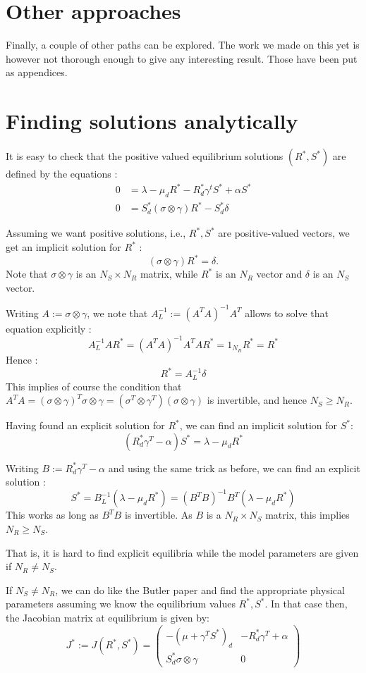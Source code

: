 \documentclass[12pt, titlepage]{report}
\begin{document}
	\section{Other approaches}
	Finally, a couple of other paths can be explored. The work we made on this yet is however not thorough enough to give any interesting result. Those have been put as appendices.
		\clearpage
		\section{Finding solutions analytically}
		It is easy to check that the positive valued equilibrium solutions $(R^*, S^*)$ are defined by the equations :
		\begin{align}
			0 &= \lambda - \mu_d R^* - R^*_d \gamma^t S^* + \alpha S^*  \label{eq : eq1}\\
			 0 &= S^*_d (\sigma \otimes \gamma) R^* - S^*_d \delta \label{eq : eq2}
		\end{align}

		Assuming we want positive solutions, i.e., $R^*, S^*$ are positive-valued vectors, we get an implicit solution for $R^*$ : $$ (\sigma \otimes \gamma) R^* = \delta. $$ Note that $\sigma \otimes \gamma$ is an $N_S \times N_R$ matrix, while $R^*$ is an $N_R$ vector and $\delta$ is an $N_S$ vector.

		Writing $A:= \sigma \otimes \gamma$, we note that $A_L^{-1} := (A^T A)^{-1} A^T$ allows to solve that equation explicitly : $$ A_L^{-1} A R^* = (A^T A)^{-1} A^T A R^* = 1_{N_R} R^* = R^*$$ Hence : $$ R^* = A_L^{-1} \delta $$ This implies of course the condition that $A^T A = (\sigma \otimes \gamma)^T \sigma \otimes \gamma = (\sigma^T \otimes \gamma^T) (\sigma \otimes \gamma) $ is invertible, and hence $N_S \geq N_R $.

		Having found an explicit solution for $R^*$, we can find an implicit solution for $S^*$: $$ (R^*_d \gamma^T -\alpha) S^* = \lambda - \mu_d R^* $$

		Writing $B := R^*_d \gamma^T - \alpha$ and using the same trick as before, we can find an explicit solution : $$ S^* = B_L^{-1} (\lambda-\mu_d R^*) = (B^T B)^{-1} B^T (\lambda-\mu_d R^*) $$ This works as long as $B^T B$ is invertible. As $B$ is a $N_R \times N_S$ matrix, this implies $N_R \geq N_S$.

		That is, it is hard to find explicit equilibria while the model parameters are given if $N_R \neq N_S$.

		If $N_S \neq N_R$, we can do like the Butler paper and find the appropriate physical parameters assuming we know the equilibrium values $R^*, S^*$. In that case then, the Jacobian matrix at equilibrium is given by:
		\begin{equation}
		 J^* := J(R^*, S^*) = \begin{pmatrix} -(\mu + \gamma^T S^*)_d & -R^*_d \gamma^T + \alpha \\ S^*_d \sigma \otimes \gamma & 0 \end{pmatrix} \label{eq : general jacobian positive equilibrium}
		 \end{equation}
		 		\clearpage
\end{document}
